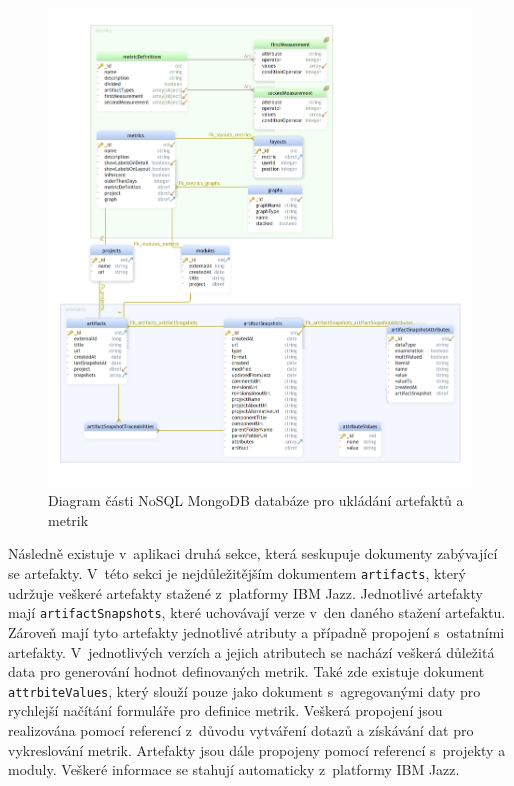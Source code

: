 \documentclass[czech,master]{diploma}
\begin{document}
\begin{figure}[!ht]
    \centering
    \includegraphics[width=1\textwidth]{Diplomka/Figures/db_diagram.png}
    \caption{Diagram části NoSQL MongoDB databáze pro ukládání artefaktů a metrik}
    \label{fig:mongo_diagram}
\end{figure}
Následně existuje v~aplikaci druhá sekce, která seskupuje dokumenty zabývající se artefakty. V~této sekci je nejdůležitějším dokumentem \texttt{artifacts}, který udržuje veškeré artefakty stažené z~platformy IBM Jazz. Jednotlivé artefakty mají \texttt{artifactSnapshots}, které uchovávají verze v~den daného stažení artefaktu. Zároveň mají tyto artefakty jednotlivé atributy a případně propojení s~ostatními artefakty. V~jednotlivých verzích a jejich atributech se nachází veškerá důležitá data pro generování hodnot definovaných metrik. Také zde existuje dokument \texttt{attrbiteValues}, který slouží pouze jako dokument s~agregovanými daty pro rychlejší načítání formuláře pro definice metrik. Veškerá propojení jsou realizována pomocí referencí z~důvodu vytváření dotazů a získávání dat pro vykreslování metrik. Artefakty jsou dále propojeny pomocí referencí s~projekty a moduly. Veškeré informace se stahují automaticky z~platformy IBM Jazz.
\end{document}
